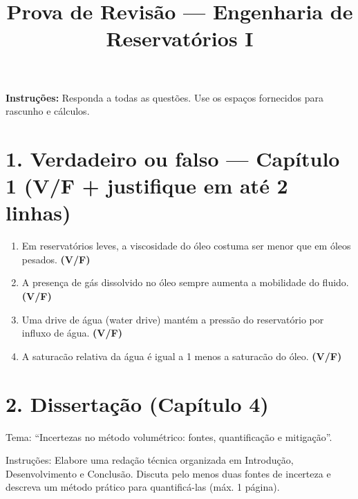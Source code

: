 \documentclass[11pt,a4paper]{article}
\title{Prova de Revis\~ao — Engenharia de Reservat\'orios I}
\author{}
\date{}
\begin{document}
\maketitle
\thispagestyle{empty}
\noindent\textbf{Instru\c{c}\~oes:} Responda a todas as quest\~oes. Use os espa\c{c}os fornecidos para rascunho e c\'alculos.
\vspace{1em}

\section*{1. Verdadeiro ou falso — Cap\'itulo 1 (V/F + justifique em at\'e 2 linhas)}
\begin{enumerate}[label=\alph*)]
\item Em reservat\'orios leves, a viscosidade do \'oleo costuma ser menor que em \'oleos pesados. \hfill \textbf{(V/F)}\\
\vspace{2\baselineskip}
\item A presen\c{c}a de g\'as dissolvido no \'oleo sempre aumenta a mobilidade do fluido. \hfill \textbf{(V/F)}\\
\vspace{2\baselineskip}
\item Uma drive de \'agua (water drive) mant\'em a press\~ao do reservat\'orio por influxo de \'agua. \hfill \textbf{(V/F)}\\
\vspace{2\baselineskip}
\item A saturac\~ao relativa da \'agua \'e igual a 1 menos a saturac\~ao do \'oleo. \hfill \textbf{(V/F)}\\
\vspace{2\baselineskip}
\end{enumerate}

\section*{2. Disserta\c{c}\~ao (Cap\'itulo 4)}
Tema: ``Incertezas no m\'etodo volum\'etrico: fontes, quantifica\c{c}\~ao e mitiga\c{c}\~ao''.

Instru\c{c}\~oes: Elabore uma reda\c{c}\~ao t\'ecnica organizada em Introdu\c{c}\~ao, Desenvolvimento e Conclus\~ao. Discuta pelo menos duas fontes de incerteza e descreva um m\'etodo pr\'atico para quantific\'a-las (m\'ax. 1 p\'agina).

\vspace{8\baselineskip}
\end{document}
